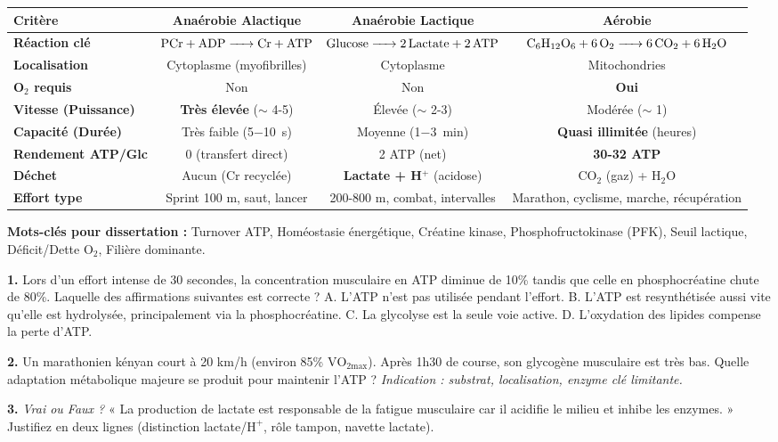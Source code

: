 \documentclass[11pt]{article}
\newcommand{\cle}[1]{{\popxbold\color{popdark}#1}}
\begin{document}
\begin{aretenir}
\begin{center}
\begin{tabular}{|l|c|c|c|}\hline
\textbf{Critère} & \textbf{Anaérobie Alactique} & \textbf{Anaérobie Lactique} & \textbf{Aérobie} \\ \hline
\textbf{Réaction clé} & $\ce{PCr + ADP -> Cr + ATP}$ & $\ce{Glucose -> 2 Lactate + 2 ATP}$ & $\ce{C6H12O6 + 6 O2 -> 6 CO2 + 6 H2O}$ \\ \hline
\textbf{Localisation} & Cytoplasme (myofibrilles) & Cytoplasme & Mitochondries \\ \hline
\textbf{O$_2$ requis} & Non & Non & \textbf{Oui} \\ \hline
\textbf{Vitesse (Puissance)} & \textbf{Très élevée} ($\sim$ 4-5) & Élevée ($\sim$ 2-3) & Modérée ($\sim$ 1) \\ \hline
\textbf{Capacité (Durée)} & Très faible (\SI{5-10}{s}) & Moyenne (\SI{1-3}{min}) & \textbf{Quasi illimitée} (heures) \\ \hline
\textbf{Rendement ATP/Glc} & 0 (transfert direct) & 2 ATP (net) & \textbf{30-32 ATP} \\ \hline
\textbf{Déchet} & Aucun (Cr recyclée) & \textbf{Lactate + H$^+$} (acidose) & $\text{CO}_2$ (gaz) + $\text{H}_2\text{O}$ \\ \hline
\textbf{Effort type} & Sprint 100 m, saut, lancer & 200-800 m, combat, intervalles & Marathon, cyclisme, marche, récupération \\ \hline
\end{tabular}
\end{center}
\textbf{Mots-clés pour dissertation :} \cle{Turnover ATP}, \cle{Homéostasie énergétique}, \cle{Créatine kinase}, \cle{Phosphofructokinase (PFK)}, \cle{Seuil lactique}, \cle{Déficit/Dette O$_2$}, \cle{Filière dominante}.
\end{aretenir}

\begin{exercice}
\textbf{1.} Lors d'un effort intense de 30 secondes, la concentration musculaire en ATP diminue de 10\% tandis que celle en phosphocréatine chute de 80\%. Laquelle des affirmations suivantes est correcte ?
A. L'ATP n'est pas utilisée pendant l'effort.
B. L'ATP est resynthétisée aussi vite qu'elle est hydrolysée, principalement via la phosphocréatine.
C. La glycolyse est la seule voie active.
D. L'oxydation des lipides compense la perte d'ATP.

\textbf{2.} Un marathonien kényan court à 20 km/h (environ 85\% $\text{VO}_{2\text{max}}$). Après 1h30 de course, son glycogène musculaire est très bas. Quelle adaptation métabolique majeure se produit pour maintenir l'ATP ?
\textit{Indication : substrat, localisation, enzyme clé limitante.}

\textbf{3.} \emph{Vrai ou Faux ?} « La production de lactate est responsable de la fatigue musculaire car il acidifie le milieu et inhibe les enzymes. » Justifiez en deux lignes (distinction lactate/$\text{H}^+$, rôle tampon, navette lactate).
\end{exercice}
\end{document}

